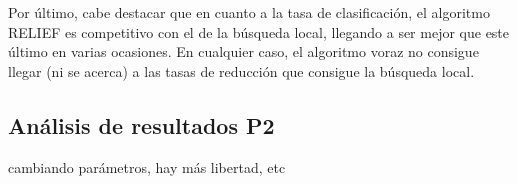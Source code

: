 \documentclass[12pt]{article}
\begin{document}
Por último, cabe destacar que en cuanto a la tasa de clasificación, el algoritmo RELIEF es competitivo con el de la búsqueda local, llegando a ser mejor que este último en varias ocasiones. En cualquier caso, el algoritmo voraz no consigue llegar (ni se acerca) a las tasas de reducción que consigue la búsqueda local.

\subsection*{Análisis de resultados P2}
\label{analisis}

cambiando parámetros, hay más libertad, etc
\end{document}
